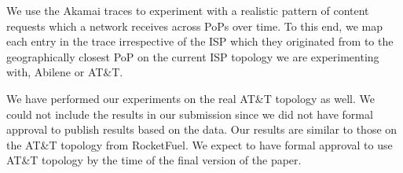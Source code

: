 We use the Akamai traces to experiment with a realistic pattern of content requests which a network receives across PoPs over time. To this end, we map each entry in the trace irrespective of the ISP which they originated from to the geographically closest PoP on the current ISP topology we are experimenting with,  Abilene or AT\&T.

We have performed our experiments on the real AT\&T topology as well. We could not include the results in our submission since we did not have formal approval to publish results based on the data. Our results are similar to those on the AT\&T topology from RocketFuel. We expect to have formal approval to use AT\&T topology by the time of the final version of the paper.

